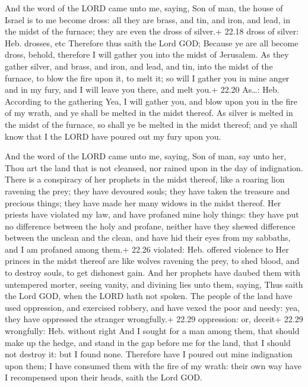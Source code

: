  And the word of the LORD came unto me, saying,
 Son of man, the house of Israel is to me become dross: all
they are brass, and tin, and iron, and lead, in the midst of the
furnace; they are even the dross of silver.+ 22.18 dross of silver: Heb.
drosses, etc  Therefore thus saith the Lord GOD; Because ye
are all become dross, behold, therefore I will gather you into the midst
of Jerusalem.  As they gather silver, and brass, and iron,
and lead, and tin, into the midst of the furnace, to blow the fire upon
it, to melt it; so will I gather you in mine anger and in my fury, and I
will leave you there, and melt you.+ 22.20 As\ldots: Heb. According to
the gathering  Yea, I will gather you, and blow upon you in
the fire of my wrath, and ye shall be melted in the midst thereof.
 As silver is melted in the midst of the furnace, so shall
ye be melted in the midst thereof; and ye shall know that I the LORD
have poured out my fury upon you.

 And the word of the LORD came unto me, saying,
 Son of man, say unto her, Thou art the land that is not
cleansed, nor rained upon in the day of indignation.  There
is a conspiracy of her prophets in the midst thereof, like a roaring
lion ravening the prey; they have devoured souls; they have taken the
treasure and precious things; they have made her many widows in the
midst thereof.  Her priests have violated my law, and have
profaned mine holy things: they have put no difference between the holy
and profane, neither have they shewed difference between the unclean and
the clean, and have hid their eyes from my sabbaths, and I am profaned
among them.+ 22.26 violated: Heb. offered violence to  Her
princes in the midst thereof are like wolves ravening the prey, to shed
blood, and to destroy souls, to get dishonest gain.  And
her prophets have daubed them with untempered morter, seeing vanity, and
divining lies unto them, saying, Thus saith the Lord GOD, when the LORD
hath not spoken.  The people of the land have used
oppression, and exercised robbery, and have vexed the poor and needy:
yea, they have oppressed the stranger wrongfully.+ 22.29 oppression: or,
deceit+ 22.29 wrongfully: Heb. without right  And I sought
for a man among them, that should make up the hedge, and stand in the
gap before me for the land, that I should not destroy it: but I found
none.  Therefore have I poured out mine indignation upon
them; I have consumed them with the fire of my wrath: their own way have
I recompensed upon their heads, saith the Lord GOD.

